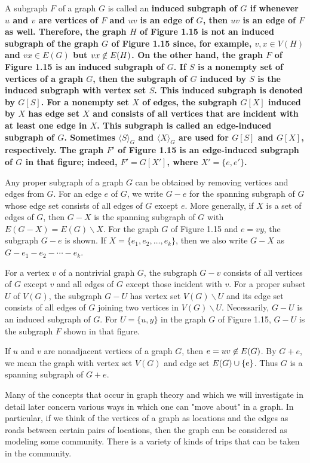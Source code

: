 A subgraph $F$ of a graph $G$ is called an \bf{induced subgraph} of $G$ if whenever $u$ and $v$ are vertices of $F$ and $uv$ is an edge of $G$, then $uv$ is an edge of $F$ as well. Therefore, the graph $H$ of Figure 1.15 is not an induced subgraph of the graph $G$ of Figure 1.15 since, for example, $v,x \in V(H)$ and $vx \in E(G)$ but $vx \centernot\in E(H)$. On the other hand, the graph $F$ of Figure 1.15 is an induced subgraph of $G$. If $S$ is a nonempty set of vertices of a graph $G$, then the \bf{subgraph of} $G$ \bf{induced by} $S$ is the induced subgraph with vertex set $S$. This induced subgraph is denoted by $G[S]$. For a nonempty set $X$ of edges, the \bf{subgraph} $G[X]$ \bf{induced by} $X$ has edge set $X$ and consists of all vertices that are incident with at least one edge in $X$. This subgraph is called an \bf{edge-induced subgraph} of $G$. Sometimes $\langle S \rangle_{G}$ and $\langle X \rangle_{G}$ are used for $G[S]$ and $G[X]$, respectively. The graph $F'$ of Figure 1.15 is an edge-induced subgraph of $G$ in that figure; indeed, $F' = G[X']$, where $X' = \{e,e'\}$.

Any proper subgraph of a graph $G$ can be obtained by removing vertices and edges from $G$. For an edge $e$ of $G$, we write $G-e$ for the spanning subgraph of $G$ whose edge set consists of all edges of $G$ except $e$. More generally, if $X$ is a set of edges of $G$, then $G-X$ is the spanning subgraph of $G$ with $E(G-X) = E(G) \smallsetminus X$. For the graph $G$ of Figure 1.15 and $e = vy$, the subgraph $G - e$ is shown. If $X = \{e_{1},e_{2},\ldots,e_{k}\}$, then we also write $G-X$ as $G-e_{1}-e_{2}-\cdots-e_{k}$.

For a vertex $v$ of a nontrivial graph $G$, the subgraph $G-v$ consists of all vertices of $G$ except $v$ and all edges of $G$ except those incident with $v$. For a proper subset $U$ of $V(G)$, the subgraph $G-U$ has vertex set $V(G) \smallsetminus U$ and its edge set consists of all edges of $G$ joining two vertices in $V(G) \smallsetminus U$. Necessarily, $G-U$ is an induced subgraph of $G$. For $U = \{u,y\}$ in the graph $G$ of Figure 1.15, $G-U$ is the subgraph $F$ shown in that figure.

If $u$ and $v$ are nonadjacent vertices of a graph $G$, then $e = uv \centernot\in E(G)$. By $G+e$, we mean the graph with vertex set $V(G)$ and edge set $E(G) \cup \{e\}$. Thus $G$ is a spanning subgraph of $G+e$.

Many of the concepts that occur in graph theory and which we will investigate in detail later concern various ways in which one can "move about" in a graph. In particular, if we think of the vertices of a graph as locations and the edges as roads between certain pairs of locations, then the graph can be considered as modeling some community. There is a variety of kinds of trips that can be taken in the community.

